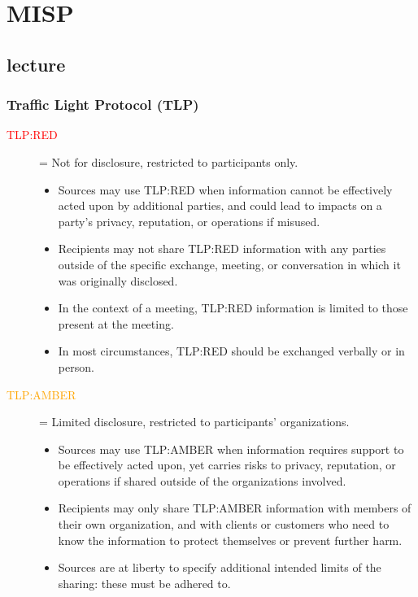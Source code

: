 
\chapter{MISP}
\newpage

\section{lecture}

\subsection{Traffic Light Protocol (TLP)}

\begin{description}
   \item[\textcolor{red}{TLP:RED}] = Not for disclosure, restricted to participants only.
   \begin{itemize}
       \item Sources may use TLP:RED when information cannot be effectively acted upon by additional parties, and could lead to impacts on a party's privacy, reputation, or operations if misused.
       \item Recipients may not share TLP:RED information with any parties outside of the specific exchange, meeting, or conversation in which it was originally disclosed.
       \item In the context of a meeting, TLP:RED information is limited to those present at the meeting.
       \item In most circumstances, TLP:RED should be exchanged verbally or in person.
   \end{itemize}

   \item[\textcolor{orange}{TLP:AMBER}] = Limited disclosure, restricted to participants' organizations.
   \begin{itemize}
       \item Sources may use TLP:AMBER when information requires support to be effectively acted upon, yet carries risks to privacy, reputation, or operations if shared outside of the organizations involved.
       \item Recipients may only share TLP:AMBER information with members of their own organization, and with clients or customers who need to know the information to protect themselves or prevent further harm.
       \item Sources are at liberty to specify additional intended limits of the sharing: these must be adhered to.
   \end{itemize}


\end{description}
